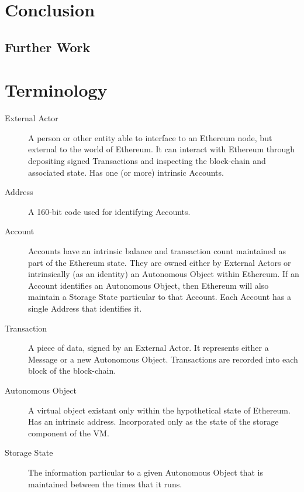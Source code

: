 \documentclass[9pt,oneside]{amsart}
\begin{document}
\begin{multicols}{2}
\section{Conclusion} \label{ch:conclusion}

\subsection{Further Work} \label{ch:further}




\appendix

\section{Terminology}

\begin{description}
\item[External Actor] A person or other entity able to interface to an Ethereum node, but external to the world of Ethereum. It can interact with Ethereum through depositing signed Transactions and inspecting the block-chain and associated state. Has one (or more) intrinsic Accounts.

\item[Address] A 160-bit code used for identifying Accounts.

\item[Account] Accounts have an intrinsic balance and transaction count maintained as part of the Ethereum state. They are owned either by External Actors or intrinsically (as an identity) an Autonomous Object within Ethereum. If an Account identifies an Autonomous Object, then Ethereum will also maintain a Storage State particular to that Account. Each Account has a single Address that identifies it.

\item[Transaction] A piece of data, signed by an External Actor. It represents either a Message or a new Autonomous Object. Transactions are recorded into each block of the block-chain.

\item[Autonomous Object] A virtual object existant only within the hypothetical state of Ethereum.  Has an intrinsic address. Incorporated only as the state of the storage component of the VM.

\item[Storage State] The information particular to a given Autonomous Object that is maintained between the times that it runs.


\end{description}
\end{multicols}
\end{document}
